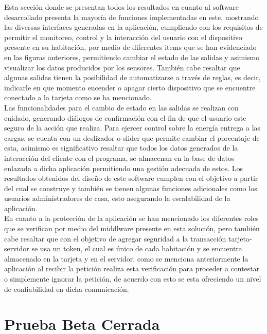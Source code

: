 Esta sección donde se presentan todos los resultados en cuanto al software desarrollado presenta la mayoría de funciones implementadas en este, mostrando las diversas interfaces generadas en la aplicación, cumpliendo con los requisitos de permitir el monitoreo, control y la interacción del usuario con el dispositivo presente en su habitación, por medio de diferentes items que se han evidenciado en las figuras anteriores, permitiendo cambiar el estado de las salidas y asimismo visualizar los datos producidos por los sensores. También cabe resaltar que algunas salidas tienen la posibilidad de automatizarse a través de reglas, es decir, indicarle en que momento encender o apagar cierto dispositivo que se encuentre conectado a la tarjeta como se ha mencionado.\\

Las funcionalidades para el cambio de estado en las salidas se realizan con cuidado, generando diálogos de confirmación con el fin de que el usuario este seguro de la acción que realiza. Para ejercer control sobre la energía entrega a las cargas, se cuenta con un deslizador o slider que permite cambiar el porcentaje de esta, asimismo es significativo resaltar que todos los datos generados de la interacción del cliente con el programa, se almacenan en la base de datos enlazada a dicha aplicación permitiendo una gestión adecuada de estos. Los resultados obtenidos del diseño de este software cumplen con el objetivo a partir del cual se construye y también se tienen algunas funciones adicionales como los usuarios administradores de casa, esto asegurando la escalabilidad de la aplicación. \\

En cuanto a la protección de la aplicación se han mencionado los diferentes roles que se verifican por medio del middlware presente en esta solución, pero también cabe resaltar que con el objetivo de agregar seguridad a la transacción tarjeta-servidor se usa un token, el cual es único de cada habitación y se encuentra almacenado en la tarjeta y en el servidor, como se menciona anteriormente la aplicación al recibir la petición realiza esta verificación para proceder a contestar o simplemente ignorar la petición, de acuerdo con esto se esta ofreciendo un nivel de confiabilidad en dicha comunicación.\\

\section{Prueba Beta Cerrada}


